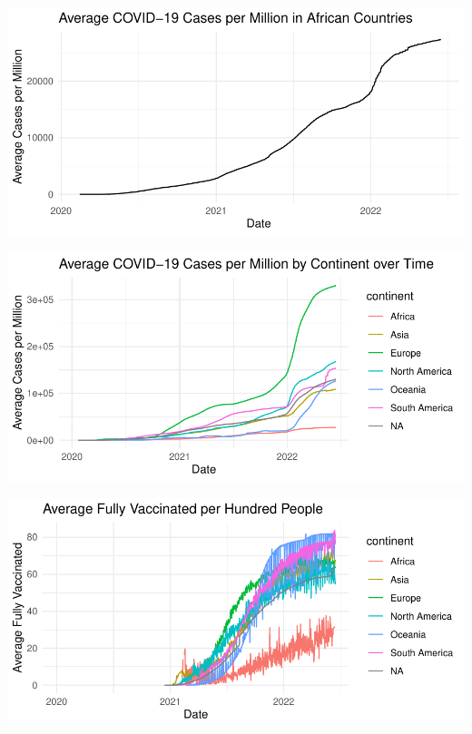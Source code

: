 \documentclass[11pt,preprint, authoryear]{elsarticle}
\let\origfigure\figure
\let\endorigfigure\endfigure
\renewenvironment{figure}[1][2] {
    \expandafter\origfigure\expandafter[H]
} {
    \endorigfigure
}
\numberwithin{equation}{section}
\numberwithin{figure}{section}
\numberwithin{table}{section}
\begin{document}
\begin{figure}[H]

{\centering \includegraphics{Q1_files/figure-latex/Figure1-1} 

}

\caption{COVID-19 Cases per Million \label{Figure1}}\label{fig:Figure1-1}
\end{figure}
\begin{figure}[H]

{\centering \includegraphics{Q1_files/figure-latex/Figure1-2} 

}

\caption{COVID-19 Cases per Million \label{Figure1}}\label{fig:Figure1-2}
\end{figure}
\begin{figure}[H]

{\centering \includegraphics{Q1_files/figure-latex/Figure1-3} 

}

\caption{COVID-19 Cases per Million \label{Figure1}}\label{fig:Figure1-3}
\end{figure}
\end{document}
